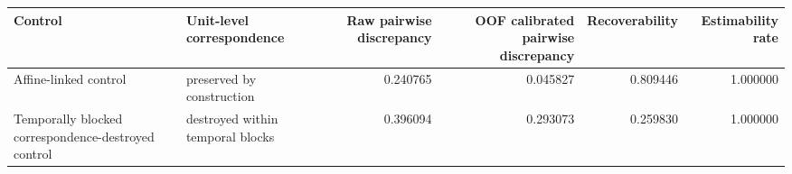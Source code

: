 \begin{tabular}{llrrrr}
\toprule
Control & Unit-level correspondence & Raw pairwise discrepancy & OOF calibrated pairwise discrepancy & Recoverability & Estimability rate \\
\midrule
Affine-linked control & preserved by construction & 0.240765 & 0.045827 & 0.809446 & 1.000000 \\
Temporally blocked correspondence-destroyed control & destroyed within temporal blocks & 0.396094 & 0.293073 & 0.259830 & 1.000000 \\
\bottomrule
\end{tabular}
